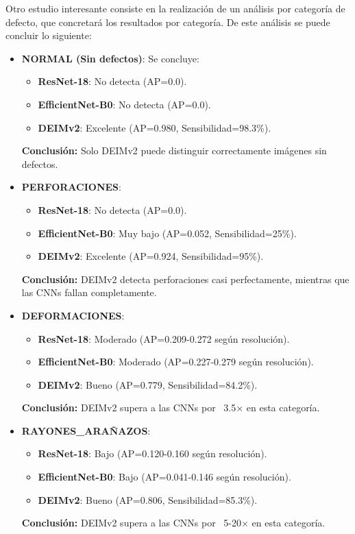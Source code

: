 Otro estudio interesante consiste en la realización de un análisis por categoría de defecto, que concretará los resultados por categoría. De este análisis se puede concluir lo siguiente:
\begin{itemize}
    \item \textbf{NORMAL (Sin defectos)}: Se concluye:    
    \begin{itemize}
        \item \textbf{ResNet-18}: No detecta (AP=0.0).
        \item \textbf{EfficientNet-B0}: No detecta (AP=0.0).
        \item \textbf{DEIMv2}: Excelente (AP=0.980, Sensibilidad=98.3\%).
    \end{itemize}
    \textbf{Conclusión:} Solo DEIMv2 puede distinguir correctamente imágenes sin defectos.
    
    \item \textbf{PERFORACIONES}:
    \begin{itemize}
        \item \textbf{ResNet-18}: No detecta (AP=0.0).
        \item \textbf{EfficientNet-B0}: Muy bajo (AP=0.052, Sensibilidad=25\%).
        \item \textbf{DEIMv2}: Excelente (AP=0.924, Sensibilidad=95\%).
    \end{itemize}
    \textbf{Conclusión:} DEIMv2 detecta perforaciones casi perfectamente, mientras que las CNNs fallan completamente.

    \item \textbf{DEFORMACIONES}: 
    \begin{itemize}
        \item \textbf{ResNet-18}: Moderado (AP=0.209-0.272 según resolución).
        \item \textbf{EfficientNet-B0}: Moderado (AP=0.227-0.279 según resolución).
        \item \textbf{DEIMv2}: Bueno (AP=0.779, Sensibilidad=84.2\%).
    \end{itemize}
    \textbf{Conclusión:} DEIMv2 supera a las CNNs por ~3.5× en esta categoría.
    
    \item \textbf{\mbox{RAYONES\_ARAÑAZOS}}: 
    \begin{itemize}
        \item \textbf{ResNet-18}: Bajo (AP=0.120-0.160 según resolución).
        \item \textbf{EfficientNet-B0}: Bajo (AP=0.041-0.146 según resolución).
        \item \textbf{DEIMv2}: Bueno (AP=0.806, Sensibilidad=85.3\%).
    \end{itemize}
    \textbf{Conclusión:} DEIMv2 supera a las CNNs por ~5-20× en esta categoría.
    

\end{itemize}
